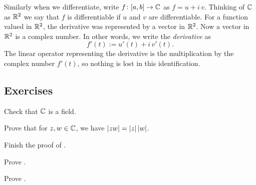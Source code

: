 Similarly when we differentiate, write $f \colon [a,b] \to {\mathbb{C}}$ as
$f = u+i\,v$.  Thinking of ${\mathbb{C}}$ as ${\mathbb{R}}^2$ we say that $f$ is differentiable
if $u$ and $v$ are differentiable.  For a function valued in ${\mathbb{R}}^2$, the derivative
was represented by a vector in ${\mathbb{R}}^2$.  Now a vector in ${\mathbb{R}}^2$ is a complex
number.  In other words,
we write
the
\emph{derivative}
as
\begin{equation*}
f'(t) := u'(t) + i \, v'(t) .
\end{equation*}
The linear operator representing the derivative is the multiplication by
the complex number $f'(t)$, so nothing is lost in this identification.


\subsection{Exercises}

\begin{exercise}
Check that ${\mathbb{C}}$ is a field.
\end{exercise}

\begin{exercise}
Prove that for $z,w \in {\mathbb{C}}$, we have
$\lvert {zw} \rvert = \lvert {z} \rvert \, \lvert {w} \rvert$.
\end{exercise}

\begin{exercise}
Finish the proof of .
\end{exercise}

\begin{exercise}
Prove .
\end{exercise}

\begin{exercise}
Prove .
\end{exercise}

